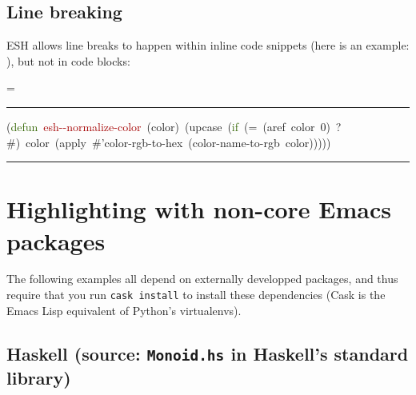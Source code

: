 \documentclass{article}
\makeatletter
\newcommand*{\ESHFontSize}{}
\newcommand*{\ESHFontFamily}{\ttfamily}
\newcommand*{\ESHInlineFontSize}{\ESHFontSize}
\newcommand*{\ESHInlineFontFamily}{\ESHFontFamily}
\newcommand*{\ESHInlineFont}{\ESHInlineFontSize\ESHInlineFontFamily}
\newcommand*{\ESHBlockFontSize}{\ESHFontSize}
\newcommand*{\ESHBlockFontFamily}{\ESHFontFamily}
\newcommand*{\ESHBlockFont}{\ESHBlockFontSize\ESHBlockFontFamily}
\newcommand*{\ESHFallbackFontFamily}{\ESHFontFamily}
\newcommand*{\ESHFallbackFont}{\ESHFallbackFontFamily}
\newcommand*{\ESHNoHyphens}{\hyphenpenalty=10000}
\newcommand*{\ESHConstantSpace}{\spaceskip=\fontdimen2\font\xspaceskip=0pt}
\newcommand*{\ESHCenterInWidthOf}[2]
  {\settowidth\ESHtempdim{#1}%
   \makebox[\ESHtempdim][c]{#2}}
\DeclareRobustCommand*{\ESHText}[1]{\ifmmode{\textnormal{#1}}\else{#1}\fi}
\newcommand*{\ESHIfFontChar}[1]
  {\iffontchar\font`#1{#1}\else{\ESHFallbackFont#1}\fi}
\def\ESHWithFallback#1{\ESHFallbackFont#1}}
\def\ESHWithFallback#1{\ESHIfFontChar{#1}}}}
\def\ESHWithFallback#1{%
     \ifnum\XeTeXfonttype\font>0%
       \ESHIfFontChar{#1}%
     \else%
       \setbox0=\hbox{\tracinglostchars=0\kern1sp#1\expandafter}%
       \ifnum\lastkern=1{\ESHFallbackFont#1}\else{#1}\fi
     \fi}}
\DeclareRobustCommand*{\ESHInlineSpecialChar}[1]
  {{\ESHInlineFontFamily\ESHWithFallback{#1}}}
\DeclareRobustCommand*{\ESHBlockSpecialChar}[1]
  {{\ESHCenterInWidthOf{\ESHBlockFontFamily{a}}{\ESHBlockFontFamily\ESHWithFallback{#1}}}}
\DeclareRobustCommand*{\ESHInlineUnicodeSubstitution}[1]
  {{\ESHInlineFontFamily#1}}
\DeclareRobustCommand*{\ESHBlockUnicodeSubstitution}[1]
  {{\ESHCenterInWidthOf{\ESHBlockFontFamily{a}}{\ESHBlockFontFamily#1}}}
\newlength{\ESHCurFontSize}
\newcommand*{\ESHSetCurFontSize}{\setlength{\ESHCurFontSize}{\f@size pt}}
\DeclareRobustCommand*{\ESHInlineRaise}[2]
  {\ESHSetCurFontSize\raisebox{#1\ESHCurFontSize}{\relsize{-2}#2}}
\DeclareRobustCommand*{\ESHBlockRaise}[2]
  {\rlap{\ESHInlineRaise{#1}{#2}}\hphantom{#2}}
\newlength{\ESHBaselineskip}
\DeclareRobustCommand*{\ESHBlockStrut}[1]
  {\rule{0pt}{#1\ESHBaselineskip}}
\newcommand*{\ESHInlineSlantItalic}[1]{\textit{#1}}
\newcommand*{\ESHBlockSlantItalic}[1]{{\itshape{#1}}} %
\newcommand*{\ESHBreakingSpace}{\ }
\newcommand*{\ESHNonbreakingSpace}{~}
\let\ESHSpecialChar\ignorespaces%
\let\ESHUnicodeSubstitution\ignorespaces%
\let\ESHRaise\ignorespaces%
\let\ESHBol\ignorespaces%
\let\ESHEol\ignorespaces%
\let\ESHSpace\ignorespaces%
\let\ESHDash\ignorespaces%
\let\ESHSlantItalic\ignorespaces%
\DeclareRobustCommand*{\ESHInlineInternalSetup}
  {\def\ESHSpecialChar{\ESHInlineSpecialChar}\def\ESHUnicodeSubstitution{\ESHInlineUnicodeSubstitution}%
   \def\ESHRaise{\ESHInlineRaise}\def\ESHSlantItalic{\ESHInlineSlantItalic}%
   \def\ESHStrut{\relax}\def\ESHBol{\relax}\def\ESHEol{\newline}\def\ESHSpace{\ESHBreakingSpace}%
   \def\ESHDash{-}}
\DeclareRobustCommand*{\ESHBlockInternalSetup}
  {\def\ESHSpecialChar{\ESHBlockSpecialChar}\def\ESHUnicodeSubstitution{\ESHBlockUnicodeSubstitution}%
   \def\ESHRaise{\ESHBlockRaise}\def\ESHSlantItalic{\ESHBlockSlantItalic}%
   \setlength{\ESHBaselineskip}{\baselineskip}\def\ESHStrut{\ESHBlockStrut}%
   \def\ESHBol{\-}\def\ESHEol{\newline}\def\ESHSpace{\ESHNonbreakingSpace}\def\ESHDash{\hbox{-}\nobreak}}
\newcommand*{\ESHInlineBasicSetup}
  {\leavevmode\ESHNoHyphens\ESHInlineFont}
\newcommand*{\ESHBlockBasicSetup}
  {\setlength{\parindent}{0pt}\raggedright\ESHNoHyphens%
   \ESHBlockFont\ESHConstantSpace}
\newcommand*{\ESHHook}{}
\newcommand*{\ESHInlineHook}{\ESHHook}
\newcommand*{\ESHBlockHook}{\ESHHook}
\DeclareRobustCommand*{\ESHInline}[1]
  {\bgroup\ESHText{\ESHInlineInternalSetup\ESHInlineBasicSetup\ESHInlineHook#1}\egroup}
\newlength{\ESHSkip}
\newcommand*{\ESHNoBreakAddVSpace}[1]{\addpenalty{\@M}\addvspace{#1}}
\newenvironment{ESHBlock}
  {\par\ESHNoBreakAddVSpace{\ESHSkip}\bgroup\ESHBlockInternalSetup\ESHBlockBasicSetup\ESHBlockHook}
  {\par\egroup\addvspace{\ESHSkip}}
\renewcommand{\ESHFontFamily}{\UbuntuMono}
\renewcommand{\ESHFallbackFontFamily}{\XITSMath}
\newcommand{\angles}[1]{$\langle\,$#1$\,\rangle$}
\DeclareRobustCommand*{\ESHInline}[1]
  {{\ESHText{\ESHInlineInternalSetup\ESHInlineBasicSetup\angles{#1}}}}
\renewenvironment{ESHBlock}{%
  \par\ESHNoBreakAddVSpace{\ESHSkip}\bgroup\ESHBlockInternalSetup\ESHBlockBasicSetup%
  \hrule\addvspace{0.5em}%
}{%
  \par\egroup\addvspace{0.5em}\hrule\addvspace{2\ESHSkip}%
}
\makeatother
\begin{document}
\subsection*{Line breaking}

ESH allows line breaks to happen within inline code snippets (here is an example: \ESHInline{\ESHBol{}\textcolor[HTML]{346604}{private}\ESHSpace{}\textcolor[HTML]{346604}{static}\ESHSpace{}\textcolor[HTML]{346604}{volatile}\ESHSpace{}\textcolor[HTML]{204A87}{int}\ESHSpace{}\textcolor[HTML]{B35000}{counter}\ESHSpace{}=\ESHSpace{}0}), but not in code blocks:

\begin{ESHBlock}
\ESHBol{}(\textcolor[HTML]{346604}{defun}\ESHSpace{}\textcolor[HTML]{A40000}{esh\ESHDash{}\ESHDash{}normalize\ESHDash{}color}\ESHSpace{}(color)\ESHSpace{}(upcase\ESHSpace{}(\textcolor[HTML]{346604}{if}\ESHSpace{}(=\ESHSpace{}(aref\ESHSpace{}color\ESHSpace{}0)\ESHSpace{}?\#)\ESHSpace{}color\ESHSpace{}(apply\ESHSpace{}\#{'}color\ESHDash{}rgb\ESHDash{}to\ESHDash{}hex\ESHSpace{}(color\ESHDash{}name\ESHDash{}to\ESHDash{}rgb\ESHSpace{}color)))))
\end{ESHBlock}


\section*{Highlighting with non-core Emacs packages}

The following examples all depend on externally developped packages, and thus
require that you run \texttt{cask install} to install these dependencies (Cask
is the Emacs Lisp equivalent of Python's virtualenvs).

\subsection*{Haskell (source: \texttt{Monoid.hs} in Haskell's standard library)}
\end{document}
